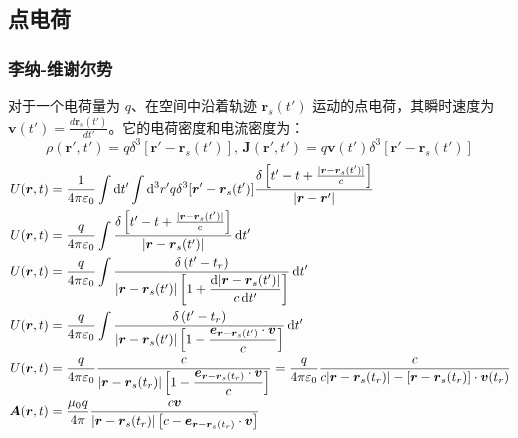 \subsection{点电荷}
\subsubsection{李纳-维谢尔势}
对于一个电荷量为 $q$、在空间中沿着轨迹 $\boldsymbol{r}_s(t')$ 运动的点电荷，其瞬时速度为 $\boldsymbol{v}(t') = \frac{d\boldsymbol{r}_s(t')}{dt'}$。它的电荷密度和电流密度为：
$$\rho(\boldsymbol{r}', t') = q \delta^3[\boldsymbol{r}' - \boldsymbol{r}_s(t')],\,
\boldsymbol{J}(\boldsymbol{r}', t') = q \boldsymbol{v}(t') \delta^3[\boldsymbol{r}' - \boldsymbol{r}_s(t')]$$
\begin{align}
    U(\boldsymbol{r}, t) &= \frac{1}{4\pi\varepsilon_0} \int \dif t' \int \dif ^3r' q \delta^3[\boldsymbol{r}' - \boldsymbol{r}_s(t')]\frac{\delta\left[t' - t + \frac{\vert{}\boldsymbol{r} - \boldsymbol{r}_s(t')\vert{}}{c}\right]}{\vert{}\boldsymbol{r} - \boldsymbol{r}'\vert{}}\nonumber\\
    U(\boldsymbol{r}, t) &= \frac{q}{4\pi\varepsilon_0} \int  \frac{\delta\left[t' - t + \frac{\vert{}\boldsymbol{r} - \boldsymbol{r}_s(t')\vert{}}{c}\right]}{\vert{}\boldsymbol{r} - \boldsymbol{r}_s(t')\vert{}}\dif t'\nonumber\\
    U(\boldsymbol{r}, t) &= \frac{q}{4\pi\varepsilon_0} \int  \frac{\delta\left(t'-t_r\right)}{\vert{}\boldsymbol{r} - \boldsymbol{r}_s(t')\vert{}\left[1+\dfrac{\dif \vert{}\boldsymbol{r} -\boldsymbol{r}_s(t')\vert{}}{c\dif t'}\right]}\dif t'\nonumber\\
    U(\boldsymbol{r}, t) &= \frac{q}{4\pi\varepsilon_0} \int  \frac{\delta\left(t'-t_r\right)}{\vert{}\boldsymbol{r} - \boldsymbol{r}_s(t')\vert{}\left[1-\dfrac{\boldsymbol{e}_{\boldsymbol{r} -\boldsymbol{r}_s(t')}\cdot\boldsymbol{v}}{c}\right]}\dif t'\nonumber\\
    U(\boldsymbol{r}, t) &= \frac{q}{4\pi\varepsilon_0} \frac{c}{\vert{}\boldsymbol{r} - \boldsymbol{r}_s(t_r)\vert{}\left[1-\dfrac{\boldsymbol{e}_{\boldsymbol{r} -\boldsymbol{r}_s(t_r)}\cdot\boldsymbol{v}}{c}\right]}= \frac{q}{4\pi\varepsilon_0} \frac{c}{c|\boldsymbol{r} - \boldsymbol{r}_s(t_r)|-[\boldsymbol{r}-\boldsymbol{r}_s(t_r)]\cdot\boldsymbol{v}(t_r)}\\
    \boldsymbol{A}(\boldsymbol{r}, t) &= \frac{\mu_0q}{4\pi} \frac{c\boldsymbol{v}}{\vert{}\boldsymbol{r} - \boldsymbol{r}_s(t_r)\vert{}\left[c-\boldsymbol{e}_{\boldsymbol{r} -\boldsymbol{r}_s(t_r)}\cdot\boldsymbol{v}\right]}
\end{align}
